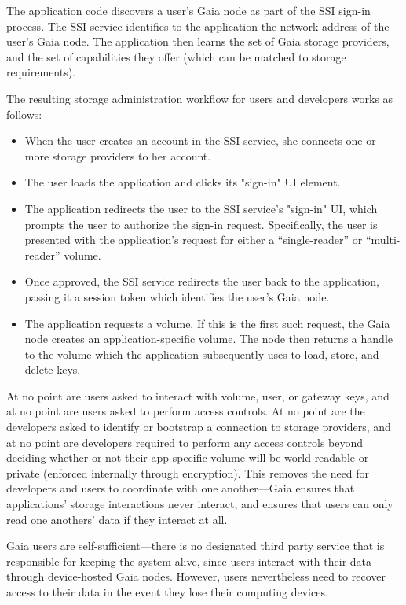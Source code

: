 
The application code discovers a user's Gaia node as part of the SSI sign-in
process.  The SSI service identifies to the application the network address
of the user's Gaia node.  The application then learns the set of Gaia storage
providers, and the set of capabilities they offer (which can be matched to
storage requirements).

The resulting storage administration workflow for users and developers works as
follows:

\begin{itemize}
   \item When the user creates an account in the SSI service, she connects one
      or more storage providers to her account.
   \item The user loads the application and clicks its "sign-in" UI element.
   \item The application redirects the user to the SSI service's "sign-in" UI,
      which prompts the user to authorize the sign-in request.  Specifically,
      the user is presented with the application's request for either a
      ``single-reader'' or ``multi-reader'' volume.
   \item Once approved, the SSI service redirects the user back to the
      application, passing it a session token which identifies the user's Gaia
      node.
   \item The application requests a volume.  If this is the first such request,
      the Gaia node creates an application-specific volume.  The node then
      returns a handle to the volume which the application subsequently uses to
      load, store, and delete keys.
\end{itemize}

At no point are users asked to interact with volume, user, or gateway keys, and at no point
are users asked to perform access controls.  At no point are the developers
asked to identify or bootstrap a connection to storage providers, and at no
point are developers required to perform any access controls beyond deciding
whether or not their app-specific volume will be world-readable or private
(enforced internally through encryption).  This removes the need for developers
and users to coordinate with one another---Gaia ensures that applications' storage
interactions never interact, and ensures that users can only read one anothers'
data if they interact at all.

Gaia users are self-sufficient---there is no designated third party service that is
responsible for keeping the system alive, since users interact with their data
through device-hosted Gaia nodes.  However, users nevertheless need to recover
access to their data in the event they lose their computing devices.

